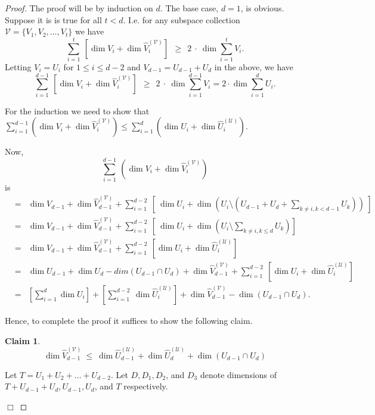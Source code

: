 \documentclass[10pt,a4paper]{article}
\newtheorem{claim}[theorem]{Claim}
\newenvironment{proofof}[1]{\noindent{\it Proof of #1. }} {{\qed}}
\def\qed{\hspace*{\fill} $\Box$\par\medskip}
\begin{document}
\begin{proof}
The proof will be by induction on $d$. The base case, $d=1$, is
obvious. Suppose it is is true for all $t <d$. I.e. for any subspace
collection $\mathcal{V} = \{V_1, V_2, \ldots, V_t\}$ we have
\[
\sum_{i=1}^{t}~ \left[\dim V_i + \dim  \hat{V}_i^{(\mathcal{V})} \right]~~ \geq ~~2~\cdot ~\dim\sum_{i=1}^t V_i.
\]
Letting $V_i= U_i$ for $1\leq i \leq d-2$ and $V_{d-1}= U_{d-1}+U_d$
in the above, we have
\[
\sum_{i=1}^{d-1}~ \left[\dim V_i + \dim \hat{V}_i^{(\mathcal{V})}
  \right] ~~\geq ~~2~\cdot~ \dim\sum_{i=1}^{d-1} V_i = 2\cdot\dim\sum_{i=1}^d U_i. 
\]

For the induction we need to show that $\sum_{i=1}^{d-1} (\dim V_i +
\dim \hat{V}_i^{(\mathcal{V})})\leq \sum_{i=1}^{d} (\dim U_i + \dim
\hat{U}_i^{(\mathcal{U})})$.

Now, \[\sum_{i=1}^{d-1}~ (\dim V_i + \dim
  \hat{V}_i^{(\mathcal{V})})\] is
\begin{eqnarray*}
 &=& \dim V_{d-1} + \dim \hat{V}_{d-1}^{(\mathcal{V})} + \sum_{i=1}^{d-2}~ \left[  ~  \dim U_i + \dim(U_i \setminus ( U_{d-1}+U_{d} + \sum_{k \neq i, k<d-1}U_k ))~ \right]  \\
 &=&  \dim V_{d-1} + \dim \hat{V}_{d-1}^{(\mathcal{V})} + \sum_{i=1}^{d-2}~ \left[ ~\dim U_i + \dim( U_i \setminus \sum_{k \neq i, k\leq d} U_k) \right] \\
 &=&  \dim V_{d-1} + \dim \hat{V}_{d-1}^{(\mathcal{V})}+ \sum_{i=1}^{d-2} ~\left[ \dim U_i + \dim \hat{U}_i^{(\mathcal{U})} \right]\\
 &=& \dim U_{d-1} + \dim U_d -dim( U_{d-1} \cap U_d ) + \dim \hat{V}_{d-1}^{(\mathcal{V})}+ \sum_{i=1}^{d-2}~\left [ \dim U_i + \dim \hat{U}_i^{(\mathcal{U})} \right] \\
  &=& \left[ \sum_{i=1}^{d} \dim U_i \right] + \left[ \sum_{i=1}^{d-2}~ \dim \hat{U}_i^{(\mathcal{U})} \right] + \dim \hat{V}_{d-1}^{(\mathcal{V})}- \dim (U_{d-1} \cap U_d).
\end{eqnarray*}

%
%
%

Hence, to complete the proof it suffices to show the following claim.

\begin{claim}
\[ \dim \hat{V}_{d-1}^{(\mathcal{V})}~ \leq~ \dim  \hat{U}_{d-1}^{(\mathcal{U})}  + \dim  \hat{U}_d^{(\mathcal{U})} + \dim (U_{d-1} \cap U_d) \]
\end{claim}
\begin{proofof}{Claim}
Let $T= U_1 + U_2 + \ldots + U_{d-2}$. Let $D, D_1, D_2$, and $D_3$ denote
dimensions of $T+U_{d-1}+U_d, U_{d-1}, U_d$, and $T$ respectively.


\end{proofof}
\end{proof}
\end{document}
